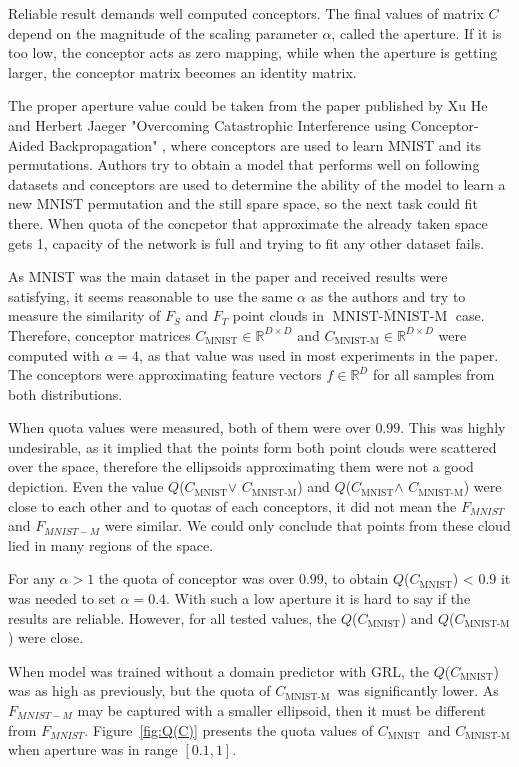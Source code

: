 \documentclass[shortabstract, inz, english]{iithesis}
\DeclareMathOperator{\mnistM}{MNIST-MNIST-M}
\DeclareMathOperator{\QCM}{MNIST}
\DeclareMathOperator{\QCMM}{MNIST-M}
\newcommand{\mnist}{$\overline{\mnistM}$ }
\newcommand{\CM}{$C_{\QCM}$}
\newcommand{\CMM}{$C_{\QCMM}$}
\begin{document}
\par
Reliable result demands well computed conceptors. The final values of matrix $C$ depend on the magnitude of the scaling parameter $\alpha$, called the aperture. If it is too low, the conceptor acts as zero mapping, while when the aperture is getting larger, the conceptor matrix becomes an identity matrix.
\par
The proper aperture value could be taken from the paper published by Xu He and Herbert Jaeger "Overcoming Catastrophic Interference using Conceptor-Aided Backpropagation" \cite{overc}, where conceptors are used to learn MNIST and its permutations. Authors try to obtain a model that performs well on following datasets and conceptors are used to determine the ability of the model to learn a new MNIST permutation and the still spare space, so the next task could fit there. When quota of the concpetor that approximate the already taken space gets 1, capacity of the network is full and trying to fit any other dataset fails.
\par
As MNIST was the main dataset in the paper and received results were satisfying, it seems reasonable to use the same $\alpha$ as the authors and try to measure the similarity of $F_{S}$ and $F_{T}$ point clouds in \mnist case. Therefore, conceptor matrices \CM $\in \mathbb{R}^{D\times D}$ and \CMM $\in \mathbb{R}^{D\times D}$ were computed with $\alpha = 4$, as that value was used in most experiments in the paper. The conceptors were approximating feature vectors $f \in \mathbb{R}^{D}$ for all samples from both distributions.
\par
When quota values were measured, both of them were over $0.99$. This was highly undesirable, as it implied that the points form both point clouds were scattered over the space, therefore the ellipsoids approximating them were not a good depiction. Even the value $Q$(\CM $\vee$ \CMM) and $Q$(\CM $\wedge$ \CMM) were close to each other and to quotas of each conceptors, it did not mean the $F_{MNIST}$ and $F_{MNIST-M}$ were similar. We could only conclude that points from these cloud lied in many regions of the space. 
\par
For any $\alpha > 1$ the quota of conceptor was over $0.99$, to obtain $Q$(\CM) < 0.9 it was needed to set $\alpha = 0.4$. With such a low aperture it is hard to say if the results are reliable. However, for all tested values, the $Q$(\CM) and $Q$(\CMM) were close.
\par
When model was trained without a domain predictor with GRL, the $Q$(\CM) was as high as previously, but the quota of \CMM \ was significantly lower. As $F_{MNIST-M}$ may be captured with a smaller ellipsoid, then it must be different from $F_{MNIST}$. Figure~\ref{fig:Q(C)} presents the quota values of \CM \ and \CMM when aperture was in range $[0.1, 1]$.
\end{document}
